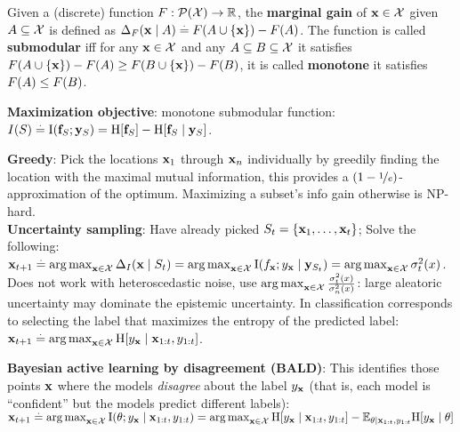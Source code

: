 Given a (discrete) function $F : \pset{\spX} \to \R$, the \textbf{marginal gain} of $\mathbf{x} \in \mathcal{X}$ given $A \subseteq \mathcal{X}$ is defined as $\Delta_F(\mathbf{x} \mid A) \overset{.}{=} F(A \cup \{\mathbf{x}\}) - F(A)$. The function is called \textbf{submodular} iff for any $\mathbf{x} \in \mathcal{X}$ and any $A \subseteq B \subseteq \mathcal{X}$ it satisfies $F(A \cup \{\mathbf{x}\}) - F(A) \geq F(B \cup \{\mathbf{x}\}) - F(B)$, it is called \textbf{monotone} it satisfies $F(A) \leq F(B)$. \\
\begin{framed}
    \textbf{Maximization objective}: monotone submodular function: \\ $I(\sS) \defeq \I{\vf_\sS}{\vy_\sS} = \H{\vf_\sS} - \H{\vf_\sS \mid \vy_\sS}$.
\end{framed}
\textbf{Greedy}: Pick the locations $\mathbf{x}_1$ through $\mathbf{x}_n$ individually by greedily finding the location with the maximal mutual information, this provides a $(1 - \nicefrac{1}{e})$-approximation of the optimum. Maximizing a subset's info gain otherwise is NP-hard.\\
\textbf{Uncertainty sampling}: Have already picked $S_t = \{\mathbf{x}_1, \dots, \mathbf{x}_t\}$; Solve the following: $\vx_{t+1} \defeq \argmax_{\vx \in \spX} \Delta_I(\vx \mid \sS_t) = \argmax_{\vx \in \spX} \Ism{f_\vx}{y_{\vx} \mid \vy_{\sS_t}}=\argmax_{\vx\in \spX}{\sigma_t^2(x)} $. Does not work with heteroscedastic noise, use \(\operatorname*{arg\,max}_{\mathbf{x}\in \mathcal{X}} \frac{\sigma_t^2(x)}{\sigma_n^2(x)} \): large aleatoric uncertainty may dominate the epistemic uncertainty. In classification corresponds to selecting the label that maximizes the entropy of the predicted label: $\vx_{t+1} \defeq \argmax_{\vx \in \spX} \H{y_{\vx} \mid \vx_{1:t}, y_{1:t}}$. \\
\begin{framed}
    \textbf{Bayesian active learning by disagreement (BALD)}: This identifies those points $\mathbf{x}$ where the models \emph{disagree} about the label $y_{\mathbf{x}}$ (that is, each model is ``confident'' but the models predict different labels): $\vx_{t+1} \defeq \argmax_{\vx \in \spX} \I{\vtheta}{y_{\vx} \mid \vx_{1:t}, y_{1:t}} = \argmax_{\vx \in \spX} \H{y_{\vx} \mid \vx_{1:t}, y_{1:t}} - \E*[\vtheta \mid \vx_{1:t}, y_{1:t}]{\H{y_{\vx} \mid \vtheta}}$ 
\end{framed}
